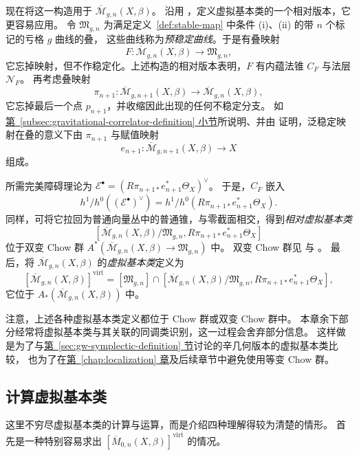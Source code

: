 现在将这一构造用于 $\overline{\mathcal M}_{g,n}(X,\beta)$。
沿用 ，定义虚拟基本类的一个相对版本，它更容易应用。
令 $\mathfrak M_{g,n}$ 为满足定义~\ref{def:stable-map} 中条件 (i)、(ii) 的带 $n$ 个标记的亏格 $g$ 曲线的叠，
这些曲线称为\emph{预稳定曲线}。于是有叠映射
\begin{equation}\label{eq:stable-map-prestable-forgetting}
F:\overline{\mathcal M}_{g,n}(X,\beta)\longrightarrow\mathfrak M_{g,n},
\end{equation}
它忘掉映射，但不作稳定化。上述构造的相对版本表明，$F$ 有内蕴法锥 $C_F$ 与法层 $\mathcal N_F$。
再考虑叠映射
\[
\pi_{n+1}:\overline{\mathcal M}_{g,n+1}(X,\beta)
\longrightarrow\overline{\mathcal M}_{g,n}(X,\beta),
\]
它忘掉最后一个点 $p_{n+1}$，并收缩因此出现的任何不稳定分支。
如\hyperref[subsec:gravitational-correlator-definition]{第~\ref*{subsec:gravitational-correlator-definition} 小节}所说明、并由  证明，泛稳定映射在叠的意义下由 $\pi_{n+1}$ 与赋值映射
\[
e_{n+1}:\overline{\mathcal M}_{g,n+1}(X,\beta)\longrightarrow X
\]
组成。

所需完美障碍理论为
$\mathcal E^\bullet=(R\pi_{n+1*}e_{n+1}^*\Theta_X)^\vee$。
于是，$C_F$ 嵌入
\[
h^1/h^0((\mathcal E^\bullet)^\vee)=h^1/h^0(R\pi_{n+1*}e_{n+1}^*\Theta_X).
\]
同样，可将它拉回为普通向量丛中的普通锥，与零截面相交，得到\emph{相对虚拟基本类}
\[
[\overline{\mathcal M}_{g,n}(X,\beta)/\mathfrak M_{g,n},
R\pi_{n+1*}e_{n+1}^*\Theta_X]
\]
位于双变 Chow 群
$A^*(\overline{\mathcal M}_{g,n}(X,\beta)\to\mathfrak M_{g,n})$ 中。
双变 Chow 群见  与 。
最后，将 $\overline{\mathcal M}_{g,n}(X,\beta)$ 的\emph{虚拟基本类}定义为
\[
[\overline{\mathcal M}_{g,n}(X,\beta)]^{\mathrm{virt}}
=[\mathfrak M_{g,n}]\cap
[\overline{\mathcal M}_{g,n}(X,\beta)/\mathfrak M_{g,n},
R\pi_{n+1*}e_{n+1}^*\Theta_X],
\]
它位于 $A_*(\overline{\mathcal M}_{g,n}(X,\beta))$ 中。

注意，上述各种虚拟基本类定义都位于 Chow 群或双变 Chow 群中。
本章余下部分经常将虚拟基本类与其关联的同调类识别，这一过程会舍弃部分信息。
这样做是为了与\hyperref[sec:gw-symplectic-definition]{第~\ref*{sec:gw-symplectic-definition} 节}讨论的辛几何版本的虚拟基本类比较，
也为了在\hyperref[chap:localization]{第~\ref*{chap:localization} 章}及后续章节中避免使用等变 Chow 群。

\subsection{计算虚拟基本类}\label{subsec:computing-virtual-class}
这里不穷尽虚拟基本类的计算与运算，而是介绍四种理解得较为清楚的情形。
首先是一种特别容易求出 $[\overline M_{0,n}(X,\beta)]^{\mathrm{virt}}$ 的情况。

